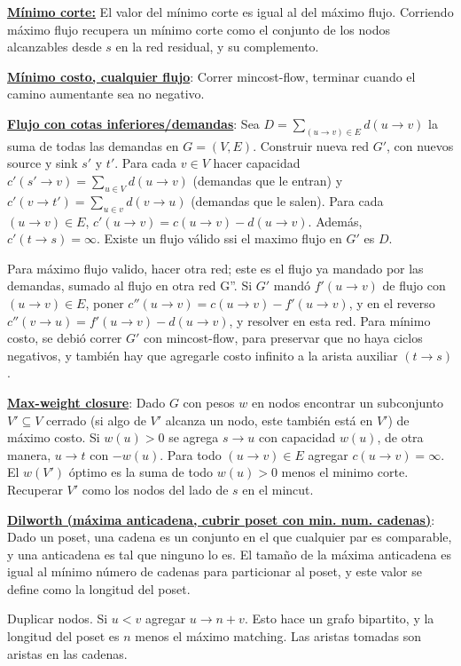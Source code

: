 \ul{\textbf{Mínimo corte:}} El valor del mínimo corte es igual al del máximo flujo. Corriendo máximo flujo recupera un mínimo corte como el conjunto de los nodos alcanzables desde $s$ en la red residual, y su complemento.

\ul{\textbf{Mínimo costo, cualquier flujo}}: Correr mincost-flow, terminar cuando el camino aumentante sea no negativo.
    
\ul{\textbf{Flujo con cotas inferiores/demandas}}: Sea $D = \sum_{(u\to v)\in E} d(u\to v)$ la suma de todas las demandas en $G = (V, E)$. Construir nueva red $G'$, con nuevos source y sink $s'$ y $t'$. Para cada $v \in V$ hacer capacidad $c'(s' \to v) = \sum_{u \in V} d(u\to v)$ (demandas que le entran) y $c'(v \to t') = \sum_{u \in v} d(v \to u)$ (demandas que le salen). Para cada $(u \to v) \in E$, $c'(u \to v) = c(u\to v) - d(u\to v)$. Adem\'as, $c'(t \to s) = \infty$. Existe un flujo válido ssi el maximo flujo en $G'$ es $D$.

Para máximo flujo valido, hacer otra red; este es el flujo ya mandado por las demandas, sumado al flujo en otra red G''. Si $G'$ mandó $f'(u\to v)$ de flujo con $(u \to v) \in E$,  poner $c''(u \to v) = c(u \to v) - f'(u \to v)$, y en el reverso $c''(v \to u) = f'(u\to v) - d(u \to v)$, y resolver en esta red. Para m\'inimo costo, se debi\'o correr $G'$ con mincost-flow, para preservar que no haya ciclos negativos, y también hay que agregarle costo infinito a la arista auxiliar $(t \to s)$.
    
\ul{\textbf{Max-weight closure}}: Dado $G$ con pesos $w$ en nodos encontrar un subconjunto $V'\subseteq V$ cerrado (si algo de $V'$ alcanza un nodo, este también está en $V'$) de m\'aximo costo. Si $w(u) > 0$ se agrega $s \to u$ con capacidad $w(u)$, de otra manera, $u \to t$ con $-w(u)$. Para todo $(u \to v) \in E$ agregar $c(u\to v) = \infty$. El $w(V')$ óptimo es la suma de todo $w(u) > 0$ menos el minimo corte. Recuperar $V'$ como los nodos del lado de $s$ en el mincut.
    
\ul{\textbf{Dilworth (máxima anticadena, cubrir poset con min. num. cadenas)}}:
Dado un poset, una cadena es un conjunto en el que cualquier par es comparable, y una anticadena es tal que ninguno lo es. El tamaño de la máxima anticadena es igual al mínimo número de cadenas para particionar al poset, y este valor se define como la longitud del poset.

Duplicar nodos. Si $u < v$ agregar $u\to n + v$. Esto hace un grafo bipartito, y la longitud del poset es $n$ menos el máximo matching. Las aristas tomadas son aristas en las cadenas.

